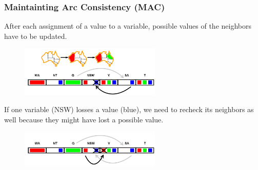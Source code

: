 \documentclass[
../../EiKI_Summary.tex,
]
{subfiles}
\begin{document}
\subsubsection{Maintainting Arc Consistency (MAC)}
After each assignment of a value to a variable, possible values of the neighbors have to be updated.

\begin{figure}
    [H]
    \centering
    \includegraphics[width=0.6\textwidth]{Pics/05/ArcConsistency1.png}
\end{figure}

If one variable (NSW) losses a value (blue), we need to recheck its neighbors as well because they might have lost a possible value.

\begin{figure}
    [H]
    \centering
    \includegraphics[width=0.6\textwidth]{Pics/05/ArcConsistency2.png}
\end{figure}

\begin{codebox}
    [AC-3 Algorithm]
    \begin{algorithm}[H]

    \end{algorithm}
\end{codebox}
\end{document}
